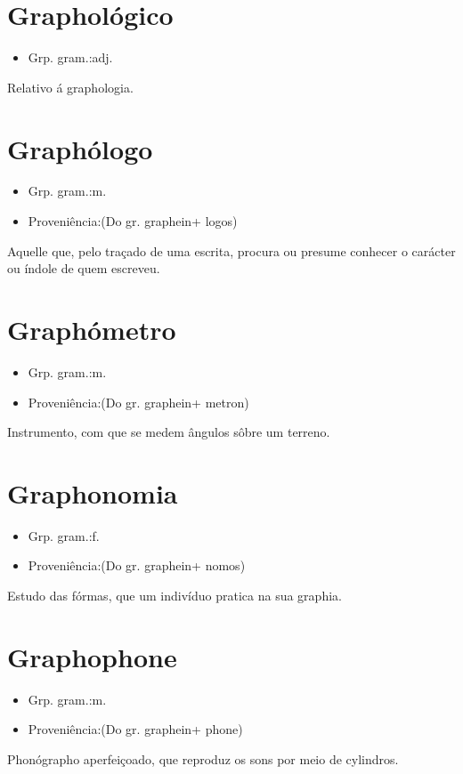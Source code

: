 \section{Graphológico}
\begin{itemize}
\item {Grp. gram.:adj.}
\end{itemize}
Relativo á graphologia.
\section{Graphólogo}
\begin{itemize}
\item {Grp. gram.:m.}
\end{itemize}
\begin{itemize}
\item {Proveniência:(Do gr. \textunderscore graphein\textunderscore  + \textunderscore logos\textunderscore )}
\end{itemize}
Aquelle que, pelo traçado de uma escrita, procura ou presume conhecer o carácter ou índole de quem escreveu.
\section{Graphómetro}
\begin{itemize}
\item {Grp. gram.:m.}
\end{itemize}
\begin{itemize}
\item {Proveniência:(Do gr. \textunderscore graphein\textunderscore  + \textunderscore metron\textunderscore )}
\end{itemize}
Instrumento, com que se medem ângulos sôbre um terreno.
\section{Graphonomia}
\begin{itemize}
\item {Grp. gram.:f.}
\end{itemize}
\begin{itemize}
\item {Proveniência:(Do gr. \textunderscore graphein\textunderscore  + \textunderscore nomos\textunderscore )}
\end{itemize}
Estudo das fórmas, que um indivíduo pratica na sua graphia.
\section{Graphophone}
\begin{itemize}
\item {Grp. gram.:m.}
\end{itemize}
\begin{itemize}
\item {Proveniência:(Do gr. \textunderscore graphein\textunderscore  + \textunderscore phone\textunderscore )}
\end{itemize}
Phonógrapho aperfeiçoado, que reproduz os sons por meio de cylindros.
